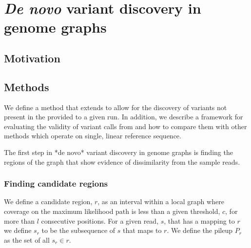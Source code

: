 
\chapter{\textit{De novo} variant discovery in genome graphs}

\ifpdf
    \graphicspath{{Chapter1/Figs/Raster/}{Chapter1/Figs/PDF/}{Chapter1/Figs/}}
\else
    \graphicspath{{Chapter1/Figs/Vector/}{Chapter1/Figs/}}
\fi


\section{Motivation}

\section{Methods}

\begin{markdown}

We define a method that extends \pandora{} to allow for the discovery of variants not present in the \prg{} provided to a given run. In addition, we describe a framework for evaluating the validity of variant calls from \pandora{} and how to compare them with other methods which operate on single, linear reference sequence.

The first step in *de novo* variant discovery in genome graphs is finding the regions of the graph that show evidence of dissimilarity from the sample reads.

\end{markdown}

\subsection{Finding candidate regions}

We define a candidate region, $r$, as an interval within a local graph where coverage on the maximum likelihood path is less than a given threshold, $c$, for more than $l$ consecutive positions. For a given read, $s$, that has a mapping to $r$ we define $s_r$ to be the subsequence of $s$ that maps to $r$. We define the pileup $P_r$ as the set of all $s_r \in r$.

